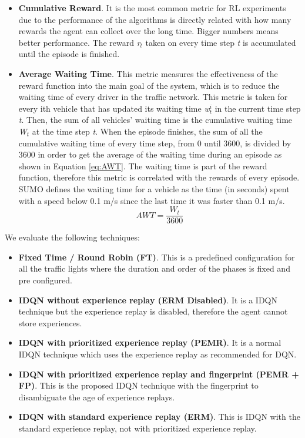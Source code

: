 \documentclass{llncs}
\begin{document}
\begin{itemize}
	\item \textbf{Cumulative Reward}. It is the most common metric for RL experiments due to the performance of the algorithms is directly related with how many rewards the agent can collect over the long time. Bigger numbers means better performance. The reward \textit{r$_{t}$} taken on every time step \textit{t} is accumulated until the episode is finished.
	
	\item \textbf{Average Waiting Time}. This metric measures the effectiveness of the reward function into the main goal of the system, which is to reduce the waiting time of every driver in the traffic network. This metric is taken for every ith vehicle that has updated its waiting time \textit{w$_{t}^{i}$} in the current  time step \textit{t}. Then, the sum of all vehicles' waiting time is the cumulative waiting time \textit{W$_{t}$} at the time step \textit{t}. When the episode finishes, the sum of all the cumulative waiting time of every time step, from 0 until 3600, is divided by 3600 in order to get the average of the waiting time during an episode as shown in Equation \ref{eq:AWT}. The waiting time is part of the reward function, therefore this metric is correlated with the rewards of every episode. SUMO defines the waiting time for a vehicle as the time (in seconds) spent with a speed below 0.1 m/s since the last time it was faster than 0.1 m/s.
\begin{equation}\label{eq:AWT}
AWT = \frac{W_{t}}{3600}
\end{equation}
\end{itemize}

We evaluate the following techniques:

\begin{itemize}
\item \textbf{Fixed Time / Round Robin (FT)}. This is a predefined configuration for all the traffic lights where the duration and order of the phases is fixed and pre configured.

\item \textbf{IDQN without experience replay (ERM Disabled)}. It is a IDQN technique but the experience replay is disabled, therefore the agent cannot store experiences.

\item \textbf{IDQN with prioritized experience replay (PEMR)}. It is a normal IDQN technique which uses the experience replay as recommended for DQN.

\item \textbf{IDQN with prioritized experience replay and fingerprint (PEMR + FP)}. This is the proposed IDQN technique with the fingerprint to disambiguate the age of experience replays.

\item \textbf{IDQN with standard experience replay (ERM)}. This is IDQN with the standard experience replay, not with prioritized experience replay.
\end{itemize}
\end{document}
